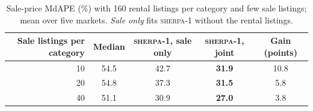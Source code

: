 \begin{table}[t]
\centering\small
\caption{Sale-price MdAPE (\%) with 160 rental listings per category and few sale listings; mean over five markets. \textit{Sale only} fits \textsc{sherpa-1} without the rental listings.}
\label{tab:joint}
\begin{tabular}{rcccc}
\toprule
Sale listings per category & Median & \textsc{sherpa-1}, sale only & \textsc{sherpa-1}, joint & Gain (points) \\
\midrule
10 & 54.5 & 42.7 & \textbf{31.9} & 10.8 \\
20 & 54.8 & 37.3 & \textbf{31.5} & 5.8 \\
40 & 51.1 & 30.9 & \textbf{27.0} & 3.8 \\
\bottomrule
\end{tabular}
\end{table}
